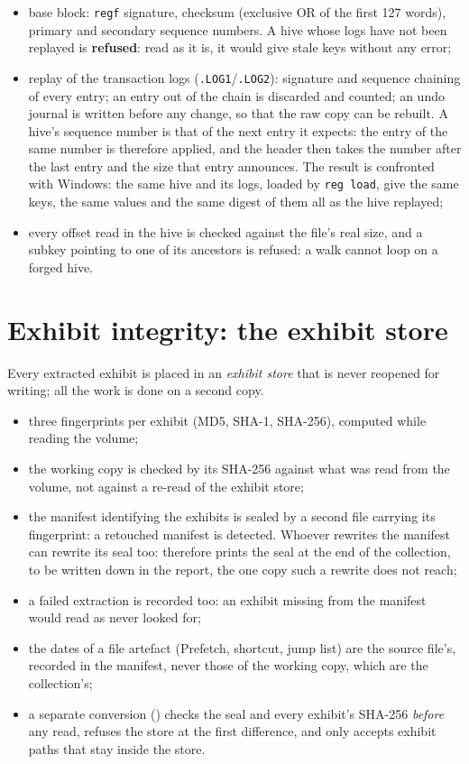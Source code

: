 \documentclass[11pt,a4paper,oneside]{report}
\begin{document}
\begin{itemize}
  \item base block: \texttt{regf} signature, checksum (exclusive OR of the
    first 127 words), primary and secondary sequence numbers. A hive whose logs
    have not been replayed is \textbf{refused}: read as it is, it would give
    stale keys without any error;
  \item replay of the transaction logs (\texttt{.LOG1}/\texttt{.LOG2}):
    signature and sequence chaining of every entry; an entry out of the chain
    is discarded and counted; an undo journal is written before any change, so
    that the raw copy can be rebuilt. A hive's sequence number is that of the
    next entry it expects: the entry of the same number is therefore applied,
    and the header then takes the number after the last entry and the size
    that entry announces. The result is confronted with Windows: the same hive
    and its logs, loaded by \texttt{reg load}, give the same keys, the same
    values and the same digest of them all as the hive \wac{} replayed;
  \item every offset read in the hive is checked against the file's real
    size, and a subkey pointing to one of its ancestors is refused: a walk
    cannot loop on a forged hive.
\end{itemize}

\section{Exhibit integrity: the exhibit store}

Every extracted exhibit is placed in an \emph{exhibit store} that is never
reopened for writing; all the work is done on a second copy.

\begin{itemize}
  \item three fingerprints per exhibit (MD5, SHA-1, SHA-256), computed while
    reading the volume;
  \item the working copy is checked by its SHA-256 against what was read from
    the volume, not against a re-read of the exhibit store;
  \item the manifest identifying the exhibits is sealed by a second file
    carrying its fingerprint: a retouched manifest is detected. Whoever
    rewrites the manifest can rewrite its seal too: \wac{} therefore prints
    the seal at the end of the collection, to be written down in the report,
    the one copy such a rewrite does not reach;
  \item a failed extraction is recorded too: an exhibit missing from the
    manifest would read as never looked for;
  \item the dates of a file artefact (Prefetch, shortcut, jump list) are the
    source file's, recorded in the manifest, never those of the working copy,
    which are the collection's;
  \item a separate conversion () checks the seal and every
    exhibit's SHA-256 \emph{before} any read, refuses the store at the first
    difference, and only accepts exhibit paths that stay inside the store.
\end{itemize}
\end{document}
